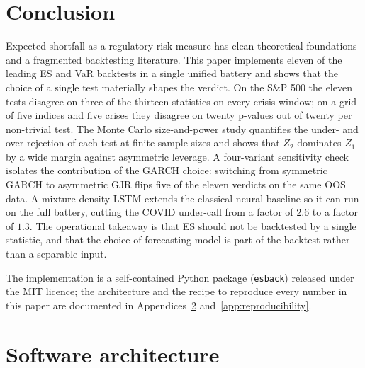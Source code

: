 \documentclass[11pt,a4paper]{article}
\newcommand{\package}[1]{\texttt{#1}}
\theoremstyle{plain}
\begin{document}
\section{Conclusion}
\label{sec:conclusion}

Expected shortfall as a regulatory risk measure has clean theoretical
foundations and a fragmented backtesting literature. This paper
implements eleven of the leading ES and VaR backtests in a single
unified battery and shows that the choice of a single test materially
shapes the verdict. On the S\&P 500 the eleven tests disagree on
three of the thirteen statistics on every crisis window; on a grid
of five indices and five crises they disagree on twenty p-values out
of twenty per non-trivial test. The Monte Carlo size-and-power study
quantifies the under- and over-rejection of each test at finite
sample sizes and shows that $Z_2$ dominates $Z_1$ by a wide margin
against asymmetric leverage. A four-variant sensitivity check
isolates the contribution of the GARCH choice: switching from
symmetric GARCH to asymmetric GJR flips five of the eleven verdicts
on the same OOS data. A mixture-density LSTM extends the classical
neural baseline so it can run on the full battery, cutting the COVID
under-call from a factor of $2.6$ to a factor of $1.3$. The
operational takeaway is that ES should not be backtested by a single
statistic, and that the choice of forecasting model is part of the
backtest rather than a separable input.

The implementation is a self-contained Python package
(\package{esback}) released under the MIT licence; the architecture
and the recipe to reproduce every number in this paper are documented
in Appendices~\ref{app:architecture} and~\ref{app:reproducibility}.




\appendix
\section{Software architecture}
\label{app:architecture}
\end{document}
